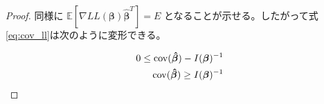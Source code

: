 \begin{proof}
    同様に $\mathbb{E}[\nabla LL(\bm{\beta})\bm{\hat\beta}^T] = E$ となることが示せる。したがって式\ref{eq:cov_ll}は次のように変形できる。
    
    \begin{align}
        0 \le \operatorname*{cov}(\bm{\hat\beta}) - I(\bm{\beta})^{-1} \\
        \operatorname*{cov}(\bm{\hat\beta}) \ge I(\bm{\beta})^{-1}
    \end{align}
\end{proof}
